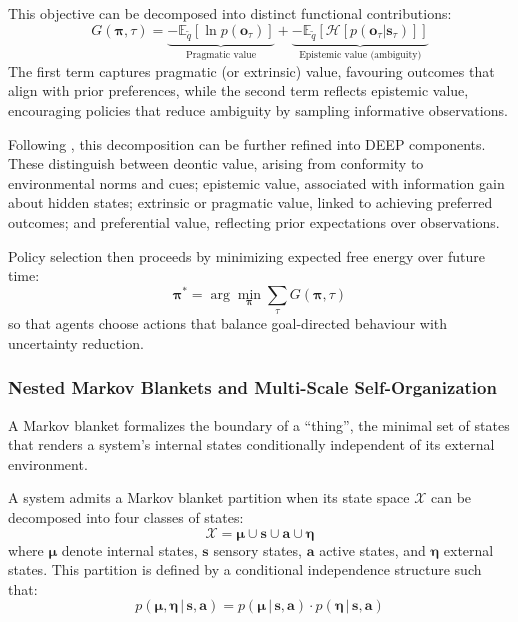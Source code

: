 \documentclass[11pt,a4paper]{article}
\theoremstyle{definition}
\newcommand{\E}{\mathbb{E}}
\newcommand{\bq}{q}
\newcommand{\bp}{p}
\newcommand{\bo}{\bm{o}}
\newcommand{\bs}{\bm{s}}
\newcommand{\ba}{\bm{a}}
\newcommand{\bpi}{\bm{\pi}}
\newcommand{\bmu}{\bm{\mu}}
\newcommand{\boldeta}{\bm{\eta}}
\begin{document}
This objective can be decomposed into distinct functional contributions:
\begin{equation}
\label{eq:deep}
G(\bpi, \tau) = \underbrace{-\E_{\tilde{\bq}}\!\left[\ln \bp(\bo_\tau)\right]}_{\text{Pragmatic value}} + \underbrace{-\E_{\tilde{\bq}}\!\left[\mathcal{H}\!\left[\bp(\bo_\tau|\bs_\tau)\right]\right]}_{\text{Epistemic value (ambiguity)}}
\end{equation}
The first term captures pragmatic (or extrinsic) value, favouring outcomes that align with prior preferences, while the second term reflects epistemic value, encouraging policies that reduce ambiguity by sampling informative observations.

Following \citet{constant2019regimes}, this decomposition can be further refined into DEEP components. These distinguish between deontic value, arising from conformity to environmental norms and cues; epistemic value, associated with information gain about hidden states; extrinsic or pragmatic value, linked to achieving preferred outcomes; and preferential value, reflecting prior expectations over observations.

Policy selection then proceeds by minimizing expected free energy over future time:
\begin{equation}
\label{eq:policy}
\bpi^* = \arg\min_{\bpi} \sum_{\tau} G(\bpi, \tau)
\end{equation}
so that agents choose actions that balance goal-directed behaviour with uncertainty reduction.


\subsubsection{Nested Markov Blankets and Multi-Scale Self-Organization}
\label{sec:nested_blankets}

A Markov blanket formalizes the boundary of a ``thing'', the minimal set of states that renders a system's internal states conditionally independent of its external environment.

A system admits a Markov blanket partition when its state space $\mathcal{X}$ can be decomposed into four classes of states:
\begin{equation}
\label{eq:blanket}
\mathcal{X} = \bmu \cup \bs \cup \ba \cup \boldeta
\end{equation}
where $\bmu$ denote internal states, $\bs$ sensory states, $\ba$ active states, and $\boldeta$ external states. This partition is defined by a conditional independence structure such that:
\begin{equation}
\label{eq:ci}
\bp(\bmu, \boldeta \,|\, \bs, \ba) = \bp(\bmu \,|\, \bs, \ba) \cdot \bp(\boldeta \,|\, \bs, \ba)
\end{equation}
\end{document}
